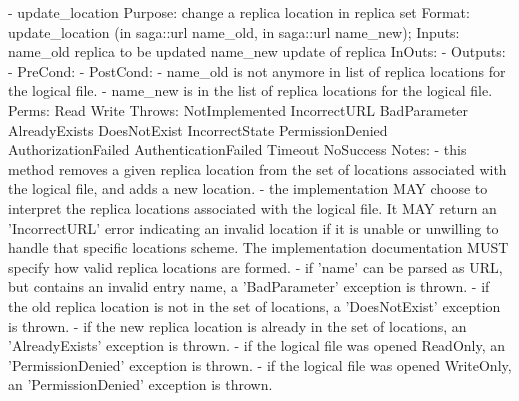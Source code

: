 \begin{myspec}
 
    - update_location
      Purpose:  change a replica location in replica set
      Format:   update_location  (in saga::url name_old,
                                  in saga::url name_new);
      Inputs:   name_old          replica to be updated
                name_new          update of replica
      InOuts:   -
      Outputs:  -
      PreCond:  -
      PostCond: - name_old is not anymore in list of replica 
                  locations for the logical file.
                - name_new is in the list of replica locations
                  for the logical file.
      Perms:    Read 
                Write
      Throws:   NotImplemented
                IncorrectURL
                BadParameter
                AlreadyExists
                DoesNotExist
                IncorrectState
                PermissionDenied
                AuthorizationFailed
                AuthenticationFailed
                Timeout
                NoSuccess
      Notes:    - this method removes a given replica location 
                  from the set of locations associated with the 
                  logical file, and adds a new location.
                - the implementation MAY choose to interpret the
                  replica locations associated with the logical 
                  file.  It MAY return an 'IncorrectURL' error 
                  indicating an invalid location if it is unable 
                  or unwilling to handle that specific locations
                  scheme.  The implementation documentation MUST 
                  specify how valid replica locations are formed.
                - if 'name' can be parsed as URL, but contains 
                  an invalid entry name, a 'BadParameter'
                  exception is thrown.
                - if the old replica location is not in the 
                  set of locations, a 'DoesNotExist' exception 
                  is thrown.
                - if the new replica location is already in the 
                  set of locations, an 'AlreadyExists' exception 
                  is thrown.
                - if the logical file was opened ReadOnly, an
                  'PermissionDenied' exception is thrown.
                - if the logical file was opened WriteOnly, an
                  'PermissionDenied' exception is thrown.
 

\end{myspec}

